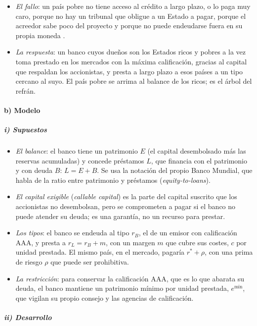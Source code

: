 \documentclass[11pt]{article}
\begin{document}
\begin{itemize}
\item \emph{El fallo}: un país pobre no tiene acceso al crédito a largo plazo, o lo paga muy caro, porque no hay un tribunal que obligue a un Estado a pagar, porque el acreedor sabe poco del proyecto y porque no puede endeudarse fuera en su propia moneda .
\item \emph{La respuesta}: un banco cuyos dueños son los Estados ricos y pobres a la vez toma prestado en los mercados con la máxima calificación, gracias al capital que respaldan los accionistas, y presta a largo plazo a esos países a un tipo cercano al suyo. El país pobre se arrima al balance de los ricos; es el árbol del refrán.
\end{itemize}

\paragraph{b) Modelo}

\subparagraph{i) Supuestos}

\begin{itemize}
\item \emph{El balance}: el banco tiene un patrimonio $E$ (el capital desembolsado más las reservas acumuladas) y concede préstamos $L$, que financia con el patrimonio y con deuda $B$: $L=E+B$. Se usa la notación del propio Banco Mundial, que habla de la ratio entre patrimonio y préstamos (\emph{equity-to-loans}).
\item \emph{El capital exigible} (\emph{callable capital}) es la parte del capital suscrito que los accionistas no desembolsan, pero se comprometen a pagar si el banco no puede atender su deuda; es una garantía, no un recurso para prestar.
\item \emph{Los tipos}: el banco se endeuda al tipo $r_B$, el de un emisor con calificación AAA, y presta a $r_L=r_B+m$, con un margen $m$ que cubre sus costes, $c$ por unidad prestada. El mismo país, en el mercado, pagaría $r^*+\rho$, con una prima de riesgo $\rho$ que puede ser prohibitiva.
\item \emph{La restricción}: para conservar la calificación AAA, que es lo que abarata su deuda, el banco mantiene un patrimonio mínimo por unidad prestada, $e^{\min}$, que vigilan su propio consejo y las agencias de calificación.
\end{itemize}

\subparagraph{ii) Desarrollo}
\end{document}
